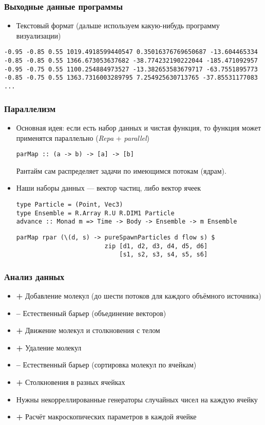 \documentclass[onlymath]{beamer}
\newcommand\good{{\color{green!50!black} \textbf{+}}}
\newcommand\bad{{\color{red!50!black} \textbf{--}}}
\begin{document}
\begin{frame}[fragile]
  \frametitle{Выходные данные программы}
  \begin{itemize}
  \item Текстовый формат (дальше используем какую-нибудь программу
    визуализации)
  \end{itemize}
\begin{lstlisting}
-0.95 -0.85 0.55 1019.4918599440547 0.35016376769650687 -13.604465334
-0.85 -0.85 0.55 1366.673053637682 -38.774232190222044 -185.471092957
-0.95 -0.75 0.55 1100.254884973527 -13.382653583679717 -63.7551895773
-0.85 -0.75 0.55 1363.7316003289795 7.254925630713765 -37.85531177083
...
\end{lstlisting}
\end{frame}

\begin{frame}
  \frametitle{Параллелизм}
  \begin{itemize}
  \item Основная идея: если есть набор данных и чистая функция, то
    функция может применятся параллельно (\emph{Repa} +
    \emph{parallel})
\begin{lstlisting}
parMap :: (a -> b) -> [a] -> [b]
\end{lstlisting}
Рантайм сам распределяет задачи по имеющимся потокам (ядрам).
  \item Наши наборы данных — вектор частиц, либо вектор ячеек
\begin{lstlisting}
type Particle = (Point, Vec3)
type Ensemble = R.Array R.U R.DIM1 Particle
advance :: Monad m => Time -> Body -> Ensemble -> m Ensemble
\end{lstlisting}
\begin{lstlisting}
parMap rpar (\(d, s) -> pureSpawnParticles d flow s) $
                        zip [d1, d2, d3, d4, d5, d6]
                            [s1, s2, s3, s4, s5, s6]
\end{lstlisting}
  \end{itemize}
\end{frame}

\begin{frame}
  \frametitle{Анализ данных}
  \begin{itemize}
  \item \good{} Добавление молекул (до шести потоков для каждого
    объёмного источника)
  \item \bad{} Естественный барьер (объединение векторов)
  \item \good{} Движение молекул и столкновения с телом
  \item \good{} Удаление молекул
  \item \bad{} Естественный барьер (сортировка молекул по ячейкам)
  \item \good{} Столкновения в разных ячейках
  \item Нужны некорреллированные генераторы случайных чисел на каждую ячейку
  \item \good{} Расчёт макроскопических параметров в каждой ячейке
  \end{itemize}
\end{frame}
\end{document}
